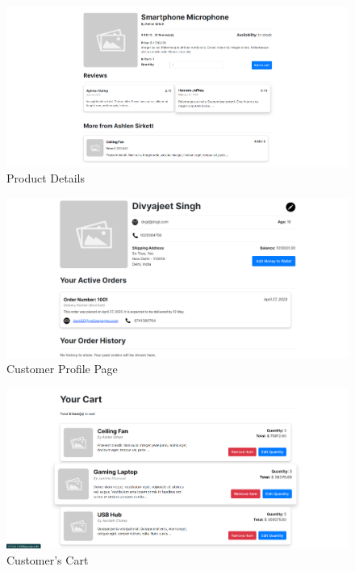 \divider

\begin{figure}[H]
    \includegraphics[width=1.0\textwidth]{./../Assets/product-details.png}
    \caption{Product Details}
\end{figure}

\divider

\pagebreak

\divider

\begin{figure}[H]
    \includegraphics[width=1.0\textwidth]{./../Assets/customer-profile.png}
    \caption{Customer Profile Page}
\end{figure}

\divider

\begin{figure}[H]
    \includegraphics[width=1.0\textwidth]{./../Assets/cart.png}
    \caption{Customer's Cart}
\end{figure}

\divider